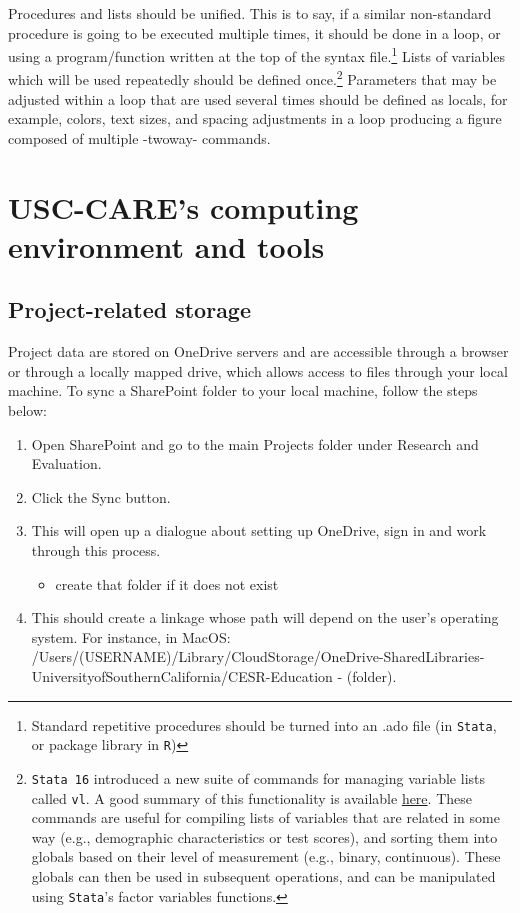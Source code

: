 {Procedures and lists should be unified. This is to say, if a similar non-standard procedure is going to be executed multiple times, it should be done in a loop, or using a program/function written at the top of the syntax file.\footnote{Standard repetitive procedures should be turned into an .ado file (in \texttt{Stata}, or package library in \texttt{R})} Lists of variables which will be used repeatedly should be defined once.\footnote{\texttt{Stata 16} introduced a new suite of commands for managing variable lists called \texttt{vl}. A good summary of this functionality is available \href{https://errickson.net/stata-16/02-vl.html}{here}. These commands are useful for compiling lists of variables that are related in some way (e.g., demographic characteristics or test scores), and sorting them into globals based on their level of measurement (e.g., binary, continuous). These globals can then be used in subsequent operations, and can be manipulated using \texttt{Stata}'s factor variables functions.} Parameters that may be adjusted within a loop that are used several times should be defined as locals, for example, colors, text sizes, and spacing adjustments in a loop producing a figure composed of multiple -twoway- commands.

\section{USC-CARE's computing environment and tools} \label{sec:environment}

\subsection{Project-related storage}

Project data are stored on OneDrive servers and are accessible through a browser or through a locally mapped drive, which allows access to files through your local machine. To sync a SharePoint folder to your local machine, follow the steps below:

\begin{enumerate}
	\item Open SharePoint and go to the main Projects folder under Research and Evaluation.
	\item Click the Sync button.
	\item This will open up a dialogue about setting up OneDrive, sign in and work through this process.
	\begin{itemize}
		\item create that folder if it does not exist
	\end{itemize}
	\item This should create a linkage whose path will depend on the user's operating system. For instance, in MacOS: /Users/(USERNAME)/Library/CloudStorage/OneDrive-SharedLibraries-UniversityofSouthernCalifornia/CESR-Education - (folder).
\end{enumerate}


}
